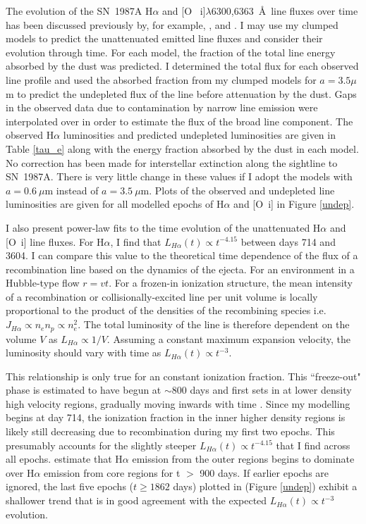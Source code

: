 The evolution of the SN~1987A H$\alpha$ and [O~{\sc 
i}]$\lambda$6300,6363~\AA\ line fluxes over time has been discussed 
previously by, for example, \citet{Li1992}, \citet{Xu1992} and 
\citet{Kozma1998b}. I may use my clumped models to predict the 
unattenuated 
emitted line fluxes and consider their evolution through time.  For each 
model, the fraction of the total line energy absorbed by the dust was 
predicted.  I determined the total flux for each observed line profile 
and used the absorbed fraction from my clumped models for $a=3.5\mu$m to 
predict the undepleted flux of the line before attenuation by the dust.  
Gaps in the observed data due to contamination by narrow line emission 
were interpolated over in order to estimate the flux of the broad line 
component. The observed H$\alpha$ luminosities and predicted undepleted 
luminosities are given in Table \ref{tau_e} along with the energy fraction 
absorbed by the dust in each model. No correction has been made for 
interstellar extinction along the sightline to SN~1987A.
There is very little change in 
these values if I adopt the models with $a=0.6~\mu$m instead of 
$a=3.5~\mu$m.  Plots of the observed and undepleted line luminosities are 
given for all modelled epochs of H$\alpha$ and [O~{\sc i}] in Figure 
\ref{undep}.




I also present power-law fits to the time evolution of the unattenuated 
H$\alpha$ and [O~{\sc i}] line fluxes.  For H$\alpha$, I find that 
$L_{H\alpha}(t) \propto t^{-4.15}$ between days 714 and 3604.  I can 
compare this value to the theoretical time dependence of the flux of a 
recombination line based on the dynamics of the ejecta.  For an 
environment in a Hubble-type flow $r=vt$.  For a frozen-in ionization 
structure, the mean intensity of a recombination or collisionally-excited 
line per unit volume is locally proportional to the product of the 
densities of the recombining species i.e. $J_{H\alpha} \propto n_e n_p 
\propto n_e^2$.  The total luminosity of the line is therefore dependent 
on the volume $V$ as $L_{H\alpha} \propto 1/V $.  Assuming a constant 
maximum expansion velocity, the luminosity should vary with time as 
$L_{H\alpha}(t) \propto t^{-3}$.

This relationship is only true for an constant ionization fraction.  This 
``freeze-out" phase is estimated to have begun at $\sim 800$ days and 
first sets in at lower density high velocity regions, gradually moving 
inwards with time \citep{Danziger1991,Fransson1993}.  Since my modelling 
begins at day 714, the ionization fraction in the inner higher density 
regions is likely still decreasing due to recombination during my first 
two epochs.  This presumably accounts for the slightly steeper 
$L_{H\alpha}(t) \propto t^{-4.15}$ that I find across all epochs.  
\citet{Kozma1998b} estimate that H$\alpha$ emission from the outer regions 
begins to dominate over H$\alpha$ emission from core regions for t $>$ 
900 days. If earlier epochs are ignored, the last five epochs ($t \ge 
1862$ days) plotted in (Figure \ref{undep}) exhibit a shallower trend that 
is in good agreement with the expected $L_{H\alpha}(t) \propto t^{-3}$ 
evolution.

